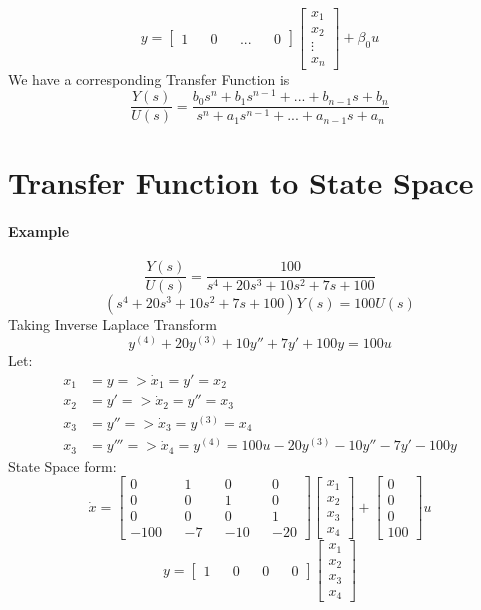 \[
y =
\begin{bmatrix}
	1 &   & 0 &   & ... &   & 0 
\end{bmatrix}
\begin{bmatrix}
	x_1    \\
	x_2    \\
	\vdots \\
	x_n    
\end{bmatrix} + \beta_0 u
\]
We have a corresponding Transfer Function is 
\[\frac{Y(s)}{U(s)} = \frac{b_0 s^n + b_1s^{n-1} + ... + b_{n-1}s+ b_n}{s^n+a_1s^{n-1}+...+a_{n-1}s+a_n}\]


\section{Transfer Function to State Space}
\paragraph{Example}
\[\frac{Y(s)}{U(s)} = \frac{100}{s^4 + 20s^3 + 10s^2 + 7s + 100}\]
\[(s^4 + 20s^3 + 10s^2 + 7s + 100)Y(s) = 100 U(s)\]
Taking Inverse Laplace Transform
\[y^{(4)} + 20y^{(3)} + 10 y'' + 7y' + 100y = 100 u\]
Let:
\[
\begin{split}
	x_1 &= y   => \dot{x}_1 = y' = x_2\\
	x_2 &= y'  => \dot{x}_2 = y'' = x_3\\
	x_3 &= y'' => \dot{x}_3 = y^{(3)} = x_4\\
	x_3 &= y'''=> \dot{x}_4 = y^{(4)} = 100u - 20y^{(3)} - 10 y'' - 7y' - 100y
\end{split}
\]
State Space form:
\[
\dot{x} = 
\begin{bmatrix}
	0    &   & 1  &   & 0   &   & 0   \\
	0    &   & 0  &   & 1   &   & 0   \\
	0    &   & 0  &   & 0   &   & 1   \\
	-100 &   & -7 &   & -10 &   & -20 
\end{bmatrix}
\begin{bmatrix}
	x_1 \\
	x_2 \\
	x_3 \\
	x_4 
\end{bmatrix} + 
\begin{bmatrix}
	0   \\
	0   \\
	0   \\
	100 
\end{bmatrix} u
\]
\[
y =
\begin{bmatrix}
	1 &   & 0 &   & 0 &   & 0 
\end{bmatrix}
\begin{bmatrix}
	x_1 \\
	x_2 \\
	x_3 \\
	x_4 
\end{bmatrix}
\]


